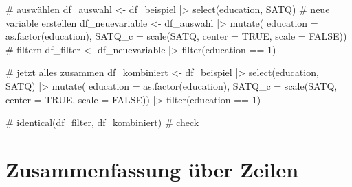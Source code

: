 \documentclass[
  letterpaper,
  DIV=11,
  numbers=noendperiod]{scrreprt}
\newenvironment{Shaded}{\begin{snugshade}}{\end{snugshade}}
\newcommand{\AttributeTok}[1]{\textcolor[rgb]{0.40,0.45,0.13}{#1}}
\newcommand{\CommentTok}[1]{\textcolor[rgb]{0.37,0.37,0.37}{#1}}
\newcommand{\ConstantTok}[1]{\textcolor[rgb]{0.56,0.35,0.01}{#1}}
\newcommand{\DecValTok}[1]{\textcolor[rgb]{0.68,0.00,0.00}{#1}}
\newcommand{\FunctionTok}[1]{\textcolor[rgb]{0.28,0.35,0.67}{#1}}
\newcommand{\NormalTok}[1]{\textcolor[rgb]{0.00,0.23,0.31}{#1}}
\newcommand{\OtherTok}[1]{\textcolor[rgb]{0.00,0.23,0.31}{#1}}
\newcommand{\SpecialCharTok}[1]{\textcolor[rgb]{0.37,0.37,0.37}{#1}}
\begin{document}
\begin{tcolorbox}[enhanced jigsaw, opacitybacktitle=0.6, left=2mm, colback=white, rightrule=.15mm, title=\textcolor{quarto-callout-tip-color}{\faLightbulb}\hspace{0.5em}{Lösung: Übung Data Wrangling}, breakable, leftrule=.75mm, colframe=quarto-callout-tip-color-frame, toptitle=1mm, toprule=.15mm, titlerule=0mm, arc=.35mm, bottomtitle=1mm, colbacktitle=quarto-callout-tip-color!10!white, coltitle=black, bottomrule=.15mm, opacityback=0]

\begin{Shaded}
\begin{Highlighting}[]
\CommentTok{\# auswählen}
\NormalTok{df\_auswahl }\OtherTok{\textless{}{-}}\NormalTok{ df\_beispiel }\SpecialCharTok{|\textgreater{}} \FunctionTok{select}\NormalTok{(education, SATQ)}
\CommentTok{\# neue variable erstellen}
\NormalTok{df\_neuevariable }\OtherTok{\textless{}{-}}\NormalTok{ df\_auswahl }\SpecialCharTok{|\textgreater{}} \FunctionTok{mutate}\NormalTok{(}
  \AttributeTok{education =} \FunctionTok{as.factor}\NormalTok{(education),}
  \AttributeTok{SATQ\_c =} \FunctionTok{scale}\NormalTok{(SATQ, }\AttributeTok{center =} \ConstantTok{TRUE}\NormalTok{, }\AttributeTok{scale =} \ConstantTok{FALSE}\NormalTok{))}
\CommentTok{\# filtern}
\NormalTok{df\_filter }\OtherTok{\textless{}{-}}\NormalTok{ df\_neuevariable }\SpecialCharTok{|\textgreater{}} \FunctionTok{filter}\NormalTok{(education }\SpecialCharTok{==} \DecValTok{1}\NormalTok{)}

\CommentTok{\# jetzt alles zusammen}
\NormalTok{df\_kombiniert }\OtherTok{\textless{}{-}}\NormalTok{ df\_beispiel }\SpecialCharTok{|\textgreater{}} 
  \FunctionTok{select}\NormalTok{(education, SATQ) }\SpecialCharTok{|\textgreater{}} 
  \FunctionTok{mutate}\NormalTok{(}
  \AttributeTok{education =} \FunctionTok{as.factor}\NormalTok{(education),}
  \AttributeTok{SATQ\_c =} \FunctionTok{scale}\NormalTok{(SATQ, }\AttributeTok{center =} \ConstantTok{TRUE}\NormalTok{, }\AttributeTok{scale =} \ConstantTok{FALSE}\NormalTok{)) }\SpecialCharTok{|\textgreater{}} 
  \FunctionTok{filter}\NormalTok{(education }\SpecialCharTok{==} \DecValTok{1}\NormalTok{)}

\CommentTok{\# identical(df\_filter, df\_kombiniert) \# check}
\end{Highlighting}
\end{Shaded}

\end{tcolorbox}

\section{Zusammenfassung über
Zeilen}\label{zusammenfassung-uxfcber-zeilen}
\end{document}
